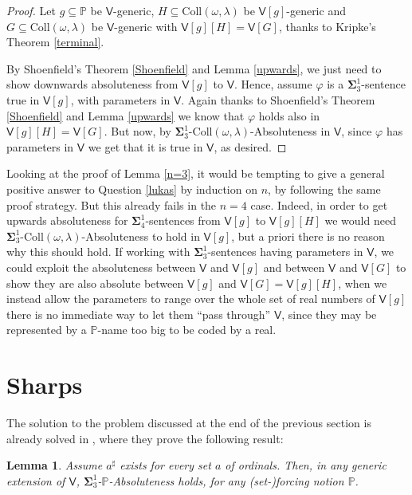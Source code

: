 \documentclass[10pt]{amsart}
\newtheorem{lemma}[theorem]{Lemma}
\theoremstyle{definition}
\begin{document}
\begin{proof}
Let $g\subseteq\mathbb P$ be $\mathsf V$-generic, $H\subseteq\mathrm{Coll}(\omega,\lambda)$ be $\mathsf V[g]$-generic and $G\subseteq\mathrm{Coll}(\omega,\lambda)$ be $\mathsf V$-generic with $\mathsf V[g][H]=\mathsf V[G]$, thanks to Kripke's Theorem \ref{terminal}.\medskip

By Shoenfield's Theorem \ref{Shoenfield} and Lemma \ref{upwards}, we just need to show downwards absoluteness from $\mathsf V[g]$ to $\mathsf V$.  Hence, assume $\varphi$ is a $\boldsymbol\Sigma^1_3$-sentence true in $\mathsf V[g]$, with parameters in $\mathsf V$. Again thanks to Shoenfield's Theorem \ref{Shoenfield} and Lemma \ref{upwards} we know that $\varphi$ holds also in $\mathsf V[g][H]=\mathsf V[G]$. But now, by $\boldsymbol\Sigma^1_3$-$\mathrm{Coll}(\omega,\lambda)$-Absoluteness in $\mathsf V$, since $\varphi$ has parameters in $\mathsf V$ we get that it is true in $\mathsf V$, as desired.
\end{proof}


Looking at the proof of Lemma \ref{n=3}, it would be tempting to give a general positive answer to Question \ref{lukas} by induction on $n$, by following the same proof strategy. But this already fails in the $n=4$ case. Indeed, in order to get upwards absoluteness for $\boldsymbol\Sigma^1_4$-sentences from $\mathsf V[g]$ to $\mathsf V[g][H]$ we would need $\boldsymbol\Sigma^1_3$-$\mathrm{Coll}(\omega,\lambda)$-Absoluteness to hold in $\mathsf V[g]$, but a priori there is no reason why this should hold. If working with $\boldsymbol\Sigma^1_3$-sentences having parameters in $\mathsf V$, we could exploit the absoluteness between $\mathsf V$ and $\mathsf V[g]$ and between $\mathsf V$ and $\mathsf V[G]$ to show they are also absolute between $\mathsf V[g]$ and $\mathsf V[G]=\mathsf V[g][H]$, when we instead allow the parameters to range over the whole set of real numbers of $\mathsf V[g]$ there is no immediate way to let them ``pass through'' $\mathsf V$, since they may be represented by a $\mathbb P$-name too big to be coded by a real.


\section{Sharps}\label{detshar}

The solution to the problem discussed at the end of the previous section is already solved in \cite{FMW}, where they prove the following result:

\begin{lemma}\label{overkill}    Assume $a^\sharp$ exists for every set $a$ of ordinals. Then, in any generic extension of $\mathsf V$, $\boldsymbol\Sigma^1_3$-$\mathbb P$-Absoluteness holds, for any (set-)forcing notion $\mathbb P$.
\end{lemma}
\end{document}
